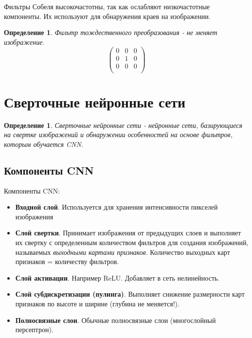 \documentclass[a4paper,12pt]{article}
\newtheorem{defn}[theorem]{Определение}
\begin{document}
Фильтры Собеля высокочастотны, так как ослабляют низкочастотные компоненты.
Их используют для обнаружения краев на изображении.

\begin{defn}
    Фильтр тождественного преобразования - не меняет изображение.
$$\begin{pmatrix}
    0 & 0 & 0 \\
    0 & 1 & 0 \\
    0 & 0 & 0 \\
\end{pmatrix}$$
\end{defn}


\section{Сверточные нейронные сети}%
\begin{defn}
    Сверточные нейронные сети - нейронные сети, базирующиеся на свертке изображений
    и обнаружении особенностей на основе фильтров, которым обучается CNN.
\end{defn}

\subsection{Компоненты CNN}%
\label{sub:компоненты_cnn}

Компоненты CNN:
\begin{itemize}
    \item \textbf{Входной слой}. Используется для хранения интенсивности пикселей
        изображения
\end{itemize}
\begin{itemize}
    \item \textbf{Слой свертки}. Принимает изображения от предыдущих слоев
        и выполняет их свертку с определенным количеством фильтров для создания 
        изображений, называемых \textit{выходными картами признаков}. Количество 
        выходных карт признаков = количеству фильтров.
\end{itemize}
\begin{itemize}
    \item \textbf{Слой активации}. Например ReLU. Добавляет в сеть нелинейность.
\end{itemize}
\begin{itemize}
    \item \textbf{Слой субдискретизации (пулинга)}. Выполняет снижение размерности
        карт признаков по высоте и ширине (глубина не меняется!).
\end{itemize}
\begin{itemize}
    \item \textbf{Полносвязные слои}. Обычные полносвязные слои (многослойный
        персептрон).
\end{itemize}
\end{document}
